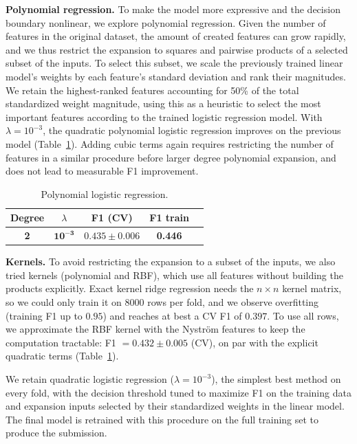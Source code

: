 \documentclass[10pt,conference,compsocconf]{IEEEtran}
\begin{document}
\textbf{Polynomial regression.} To make the model more expressive and the decision boundary nonlinear, we explore polynomial regression. Given the number of features in the original dataset, the amount of created features can grow rapidly, and we thus restrict the expansion to squares and pairwise products of a selected subset of the inputs. To select this subset, we scale the previously trained linear model's weights by each feature's standard deviation and rank their magnitudes. We retain the highest-ranked features accounting for 50\% of the total standardized weight magnitude, using this as a heuristic to select the most important features according to the trained logistic regression model. With $\lambda=10^{-3}$, the quadratic polynomial logistic regression improves on the previous model (Table~\ref{tab:polynomial}). Adding cubic terms again requires restricting the number of features in a similar procedure before larger degree polynomial expansion, and does not lead to measurable F1 improvement. 
\newline

\begin{table}[htbp]
\centering
\caption{Polynomial logistic regression.}
\label{tab:polynomial}
\begin{tabular}{ccccc}
\hline
Degree & $\lambda$ & F1 (CV) & F1 train  \\
\hline
\textbf{2} & $\mathbf{10^{-3}}$ & $\mathbf{0.435 \pm 0.006}$ & \textbf{0.446}  \\
\hline
\end{tabular}
\end{table}

\textbf{Kernels.} To avoid restricting the expansion to a subset of the inputs,
we also tried kernels (polynomial and RBF), which use all features without
building the products explicitly. Exact kernel ridge regression needs the
$n \times n$ kernel matrix, so we could only train it on $8000$ rows per fold, and we observe overfitting (training F1 up to $0.95$) and reaches at best a CV F1 of $0.397$.
To use all rows, we approximate the RBF kernel with the Nyström features
to keep the computation tractable: F1 $= 0.432 \pm 0.005$ (CV),
on par with the explicit quadratic terms (Table~\ref{tab:polynomial}).

We retain quadratic logistic regression ($\lambda = 10^{-3}$), the simplest best method on every fold, with the decision threshold tuned to maximize F1 on the training data and expansion inputs selected by their standardized weights in the linear model. The final model is retrained with this procedure on the full training set to produce the submission.
\end{document}
